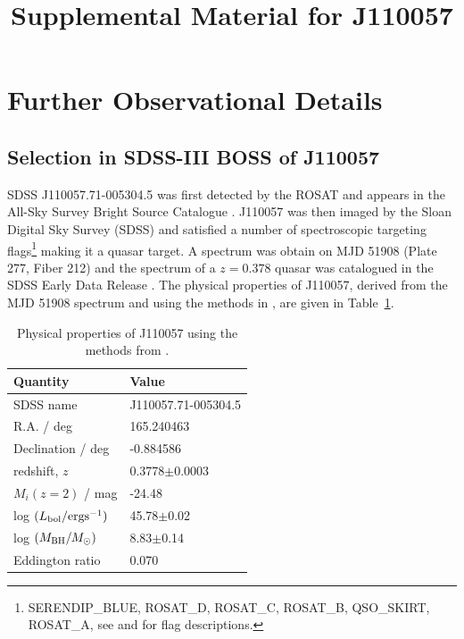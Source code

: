 \documentclass[11pt,a4paper]{article}
\begin{document}
   \title{Supplemental Material for J110057}
\maketitle

\section*{Further Observational Details}

\subsection*{Selection in SDSS-III BOSS of J110057}
SDSS J110057.71-005304.5 was first detected by the ROSAT and appears
in the All-Sky Survey Bright Source Catalogue \citep[RASS-BSC;
][]{Appenzeller1998, Voges1999}.  J110057 was then imaged by the Sloan
Digital Sky Survey (SDSS) and satisfied a number of spectroscopic
targeting flags\footnote{SERENDIP\_BLUE, ROSAT\_D, ROSAT\_C, ROSAT\_B,
QSO\_SKIRT, ROSAT\_A, see \citet{EDR} and \citet{Richards2002} for
flag descriptions.}  making it a quasar target. A spectrum was obtain
on MJD 51908 (Plate 277, Fiber 212) and the spectrum of a $z=0.378$
quasar was catalogued in the SDSS Early Data Release
\citep{Stoughton2002, Schneider2002}. The physical properties of
J110057, derived from the MJD 51908 spectrum and using the methods in
\citet{Shen2011}, are given in Table~\ref{tab:Shen_props}.

\begin{table}[]
    \centering
    \begin{tabular}{l l }
      \hline \hline 
      Quantity                                         &  Value \\
      \hline 
      SDSS name                                     &   J110057.71-005304.5 \\
      R.A. / deg                &  165.240463 \\
      Declination / deg    &   -0.884586 \\ 
      redshift, $z$                                    &   0.3778$\pm$0.0003  \\
      $M_{i}(z=2)$  / mag                          &   -24.48  \\
      log $(L_{\rm bol} / {\rm erg s}^{-1}) $  &  45.78$\pm$0.02 \\
      log $(M_{\rm BH} / M_{\odot})  $           &  8.83$\pm$0.14 \\
      Eddington ratio                                &        0.070 \\
      \hline \hline 
    \end{tabular}
    \caption{Physical properties of J110057 using the methods from 
      \citet{Shen2011}.} 
    \label{tab:Shen_props}
\end{table}
\end{document}
